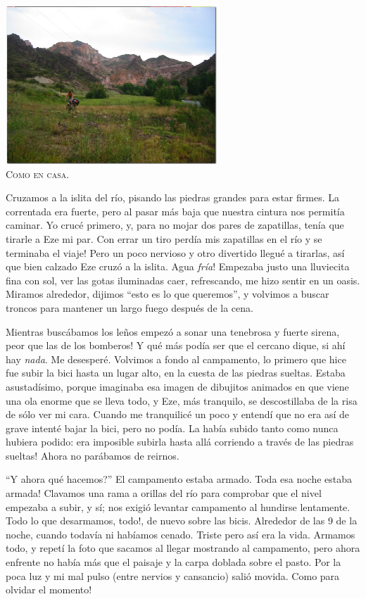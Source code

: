 \begin{center}
\includegraphics[width=300px]{images/Mendoza_0196.jpg}\\
\textsc{Como en casa.}
\end{center}

Cruzamos a la islita del r\'io, pisando las piedras grandes para estar firmes.
La correntada era fuerte, pero al pasar m\'as baja que nuestra cintura nos
permit\'ia caminar. Yo cruc\'e primero, y, para no mojar dos pares de
zapatillas, ten\'ia que tirarle a Eze mi par. \textexclamdown Con errar un tiro
perd\'ia mis zapatillas en el r\'io y se terminaba el viaje! Pero un poco
nervioso y otro divertido llegu\'e a tirarlas, as\'i que bien calzado Eze
cruz\'o a la islita. \textexclamdown Agua \emph{fr\'ia}! Empezaba justo una
lluviecita fina con sol, ver las gotas iluminadas caer, refrescando, me hizo
sentir en un oasis. Miramos alrededor, dijimos ``esto es lo que queremos'', y
volvimos a buscar troncos para mantener un largo fuego despu\'es de la cena.

Mientras busc\'abamos los le\~nos empez\'o a sonar una tenebrosa y fuerte
sirena, \textexclamdown peor que las de los bomberos! Y qu\'e m\'as pod\'ia
ser que el cercano dique, si ah\'i hay \emph{nada}. Me desesper\'e. Volvimos a
fondo al campamento, lo primero que hice fue subir la bici hasta un lugar alto,
en la cuesta de las piedras sueltas. Estaba asustad\'isimo, porque imaginaba esa
imagen de dibujitos animados en que viene una ola enorme que se lleva todo, y
Eze, m\'as tranquilo, se descostillaba de la risa de s\'olo ver mi cara. Cuando
me tranquilic\'e un poco y entend\'i que no era as\'i de grave intent\'e bajar
la bici, pero no pod\'ia. La hab\'ia subido tanto como nunca hubiera podido:
\textexclamdown era imposible subirla hasta all\'a corriendo a trav\'es de las
piedras sueltas! Ahora no par\'abamos de reirnos.

``\textquestiondown Y ahora qu\'e hacemos?'' El campamento estaba armado.
\textexclamdown Toda esa noche estaba armada! Clavamos una rama a orillas del
r\'io para comprobar que el nivel empezaba a subir, y s\'i; nos exigi\'o
levantar campamento al hundirse lentamente. Todo lo que desarmamos,
\textexclamdown todo!, de nuevo sobre las bicis. Alrededor de las 9 de la noche,
cuando todav\'ia ni hab\'iamos cenado. Triste pero as\'i era la vida. Armamos
todo, y repet\'i la foto que sacamos al llegar mostrando al campamento, pero
ahora enfrente no hab\'ia m\'as que el paisaje y la carpa doblada sobre el
pasto. Por la poca luz y mi mal pulso (entre nervios y cansancio) sali\'o
movida. \textexclamdown Como para olvidar el momento!

